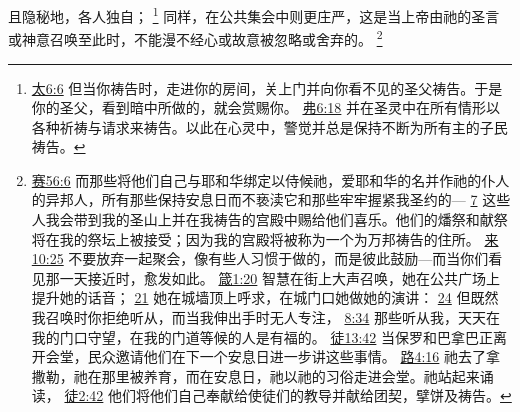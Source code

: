 \documentclass[12pt, a4paper, oneside]{ctexart}
\begin{document}
	且隐秘地，各人独自；
	\footnote {
		\href{https://biblehub.com/matthew/6-6.htm}{太6:6} 但当你祷告时，走进你的房间，关上门并向你看不见的圣父祷告。于是你的圣父，看到暗中所做的，就会赏赐你。
		\href{https://biblehub.com/ephesians/6-18.htm}{弗6:18} 并在圣灵中在所有情形以各种祈祷与请求来祷告。以此在心灵中，警觉并总是保持不断为所有主的子民祷告。
	}
	同样，在公共集会中则更庄严，这是当上帝由祂的圣言或神意召唤至此时，不能漫不经心或故意被忽略或舍弃的。
	\footnote {
		\href{https://biblehub.com/isaiah/56-6.htm}{赛56:6} 而那些将他们自己与耶和华绑定以侍候祂，爱耶和华的名并作祂的仆人的异邦人，所有那些保持安息日而不亵渎它和那些牢牢握紧我圣约的---
		\href{https://biblehub.com/isaiah/56-7.htm}{7} 这些人我会带到我的圣山上并在我祷告的宫殿中赐给他们喜乐。他们的燔祭和献祭将在我的祭坛上被接受；因为我的宫殿将被称为一个为万邦祷告的住所。
		\href{https://biblehub.com/hebrews/10-25.htm}{来10:25} 不要放弃一起聚会，像有些人习惯于做的，而是彼此鼓励---而当你们看见那一天接近时，愈发如此。
		\href{https://biblehub.com/proverbs/1-20.htm}{箴1:20} 智慧在街上大声召唤，她在公共广场上提升她的话音；
		\href{https://biblehub.com/proverbs/1-21.htm}{21} 她在城墙顶上呼求，在城门口她做她的演讲：
		\href{https://biblehub.com/proverbs/1-24.htm}{24} 但既然我召唤时你拒绝听从，而当我伸出手时无人专注，
		\href{https://biblehub.com/proverbs/8-34.htm}{8:34} 那些听从我，天天在我的门口守望，在我的门道等候的人是有福的。
		\href{https://biblehub.com/acts/13-42.htm}{徒13:42} 当保罗和巴拿巴正离开会堂，民众邀请他们在下一个安息日进一步讲这些事情。
		\href{https://biblehub.com/luke/4-16.htm}{路4:16} 祂去了拿撒勒，祂在那里被养育，而在安息日，祂以祂的习俗走进会堂。祂站起来诵读，
		\href{https://biblehub.com/acts/2-42.htm}{徒2:42} 他们将他们自己奉献给使徒们的教导并献给团契，擘饼及祷告。
	}
\end{document}
